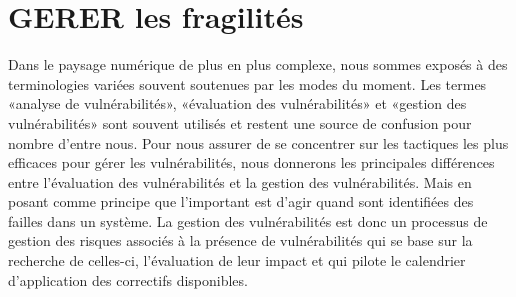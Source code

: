 \uchap{\jobname}

\section{GERER les fragilités}
\label{chap:GESTVUL}

Dans le paysage numérique de plus en plus complexe, nous sommes exposés à des terminologies variées souvent soutenues par les modes du moment. Les termes «analyse de vulnérabilités», «évaluation des vulnérabilités» et «gestion des vulnérabilités» sont souvent utilisés et restent une source de confusion pour nombre d’entre nous. Pour nous assurer de se concentrer sur les tactiques les plus efficaces pour gérer les vulnérabilités, nous donnerons les principales différences entre l’évaluation des vulnérabilités et la gestion des vulnérabilités. Mais en posant comme principe que l'important est d'agir quand sont identifiées des failles dans un système.
 La gestion des vulnérabilités est donc un processus de gestion des risques associés à la présence de vulnérabilités qui se base sur la recherche de celles-ci, l'évaluation de leur impact et qui pilote le calendrier d’application des correctifs disponibles.

